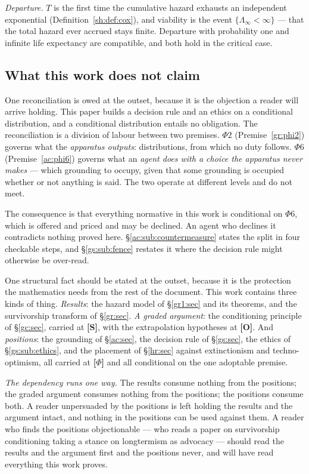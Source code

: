 \documentclass[11pt]{article}
\numberwithin{equation}{section}
\theoremstyle{plain}
\theoremstyle{definition}
\theoremstyle{remark}
\begin{document}
\emph{Departure.} $T$ is the first time the cumulative hazard exhausts an
independent exponential (Definition~\ref{sh:def:cox}), and viability is
the event $\{\Lambda_\infty<\infty\}$ --- that the total hazard ever
accrued stays finite. Departure with probability one and infinite life
expectancy are compatible, and both hold in the critical case.

\subsection{What this work does not claim}\label{intro:sub:notclaimed}

One reconciliation is owed at the outset, because it is the objection a
reader will arrive holding. This paper builds a decision rule and an
ethics on a conditional distribution, and a conditional distribution
entails no obligation. The reconciliation is a division of labour between
two premises. $\Phi2$ (Premise~\ref{gr:phi2}) governs what the
\emph{apparatus outputs}: distributions, from which no duty follows.
$\Phi6$ (Premise~\ref{ac:phi6}) governs what an \emph{agent does with a
choice the apparatus never makes} --- which grounding to occupy, given
that some grounding is occupied whether or not anything is said. The two
operate at different levels and do not meet.

The consequence is that everything normative in this work is conditional
on $\Phi6$, which is offered and priced and may be declined. An agent who
declines it contradicts nothing proved here.
\S\ref{ac:sub:countermeasure} states the split in four checkable steps,
and \S\ref{gs:sub:fence} restates it where the decision rule might
otherwise be over-read.

One structural fact should be stated at the outset, because it is the
protection the mathematics needs from the rest of the document. This work
contains three kinds of thing. \emph{Results}: the hazard model of
\S\ref{gr1:sec} and its theorems, and the survivorship transform of
\S\ref{gr:sec}. \emph{A graded argument}: the conditioning principle of
\S\ref{gc:sec}, carried at \textbf{[S]}, with the extrapolation
hypotheses at \textbf{[O]}. And \emph{positions}: the grounding of
\S\ref{ac:sec}, the decision rule of \S\ref{gs:sec}, the ethics of
\S\ref{gs:sub:ethics}, and the placement of \S\ref{hr:sec} against
extinctionism and techno-optimism, all carried at \textbf{[$\Phi$]} and
all conditional on the one adoptable premise.

\emph{The dependency runs one way.} The results consume nothing from the
positions; the graded argument consumes nothing from the positions; the
positions consume both. A reader unpersuaded by the positions is left
holding the results and the argument intact, and nothing in the positions
can be used against them. A reader who finds the positions objectionable
--- who reads a paper on survivorship conditioning taking a stance on
longtermism as advocacy --- should read the results and the argument
first and the positions never, and will have read everything this work
proves.
\end{document}

